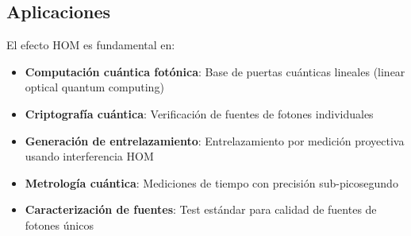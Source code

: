 \documentclass[11pt,a4paper,spanish]{book}
\begin{document}
\subsection*{Aplicaciones}

El efecto HOM es fundamental en:

\begin{itemize}
	\item \textbf{Computación cuántica fotónica}: Base de puertas cuánticas lineales (linear optical quantum computing)
	\item \textbf{Criptografía cuántica}: Verificación de fuentes de fotones individuales
	\item \textbf{Generación de entrelazamiento}: Entrelazamiento por medición proyectiva usando interferencia HOM
	\item \textbf{Metrología cuántica}: Mediciones de tiempo con precisión sub-picosegundo
	\item \textbf{Caracterización de fuentes}: Test estándar para calidad de fuentes de fotones únicos
\end{itemize}
\end{document}
